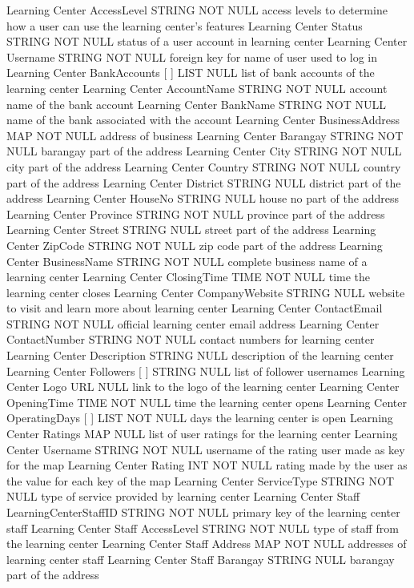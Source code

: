 Learning Center	 	AccessLevel	STRING	NOT NULL	access levels to determine how a user can use the learning center's features
Learning Center		Status	STRING	NOT NULL	status of a user account in learning center
Learning Center		Username	STRING	NOT NULL	foreign key for name of user used to log in
Learning Center	BankAccounts [ ] { }	LIST	NULL	list of bank accounts of the learning center
Learning Center	 	AccountName	STRING	NOT NULL	account name of the bank account
Learning Center		BankName	STRING	NOT NULL	name of the bank associated with the account
Learning Center	BusinessAddress { }	MAP	NOT NULL	address of business
Learning Center	 	Barangay	STRING	NOT NULL	barangay part of the address
Learning Center		City	STRING	NOT NULL	city part of the address
Learning Center		Country	STRING	NOT NULL	country part of the address
Learning Center		District	STRING	NULL	district part of the address
Learning Center		HouseNo	STRING	NULL	house no part of the address
Learning Center		Province	STRING	NOT NULL	province part of the address
Learning Center		Street	STRING	NULL	street part of the address
Learning Center		ZipCode	STRING	NOT NULL	zip code part of the address
Learning Center	BusinessName	STRING	NOT NULL	complete business name of a learning center
Learning Center	ClosingTime	TIME	NOT NULL	time the learning center closes
Learning Center	CompanyWebsite	STRING	NULL	website to visit and learn more about learning center
Learning Center	ContactEmail	STRING	NOT NULL	official learning center email address
Learning Center	ContactNumber	STRING	NOT NULL	contact numbers for learning center
Learning Center	Description	STRING	NULL	description of the learning center
Learning Center	Followers [ ]	STRING	NULL	list of follower usernames
Learning Center	Logo	URL	NULL	link to the logo of the learning center
Learning Center	OpeningTime	TIME	NOT NULL	time the learning center opens
Learning Center	OperatingDays [ ]	LIST	NOT NULL	days the learning center is open
Learning Center	Ratings { }	MAP	NULL	list of user ratings for the learning center
Learning Center	 	Username	STRING	NOT NULL	username of the rating user made as key for the map
Learning Center		Rating	INT	NOT NULL	rating made by the user as the value for each key of the map
Learning Center	ServiceType	STRING	NOT NULL	type of service provided by learning center
Learning Center Staff	LearningCenterStaffID	STRING	NOT NULL	primary key of the learning center staff
Learning Center Staff	AccessLevel	STRING	NOT NULL	type of staff from the learning center
Learning Center Staff	Address { }	MAP	NOT NULL	addresses of learning center staff
Learning Center Staff	 	Barangay	STRING	NULL	barangay part of the address
